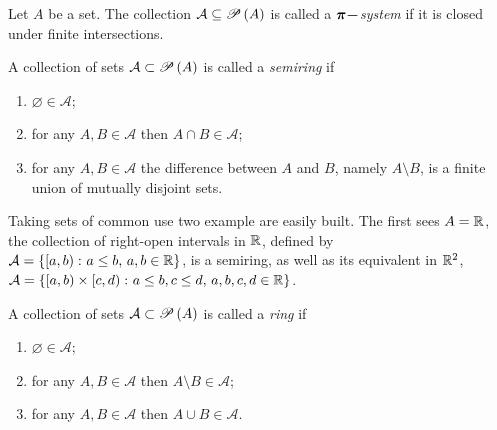 \begin{definition}[$\pi-$system]
    Let $A$ be a set. The collection $\mathcal{A}\subseteq\mathscr{P}\left( A \right)$ is called a $\boldsymbol{\pi-}$\emph{system} if it is closed under finite intersections.
\end{definition}

\begin{definition}[Semiring]
    A collection of sets $\mathcal{A}\subset\mathscr{P}\left( A \right)$ is called a \emph{semiring} if
    \begin{enumerate}[label=(\roman*)]
        \item $\varnothing\in\mathcal{A}$;
        \item for any $A,B\in\mathcal{A}$ then $A\cap B\in\mathcal{A}$;
        \item for any $A,B\in\mathcal{A}$ the difference between $A$ and $B$, namely $A\setminus B$, is a finite union of mutually disjoint sets.
    \end{enumerate}
\end{definition}
Taking sets of common use two example are easily built. The first sees $A=\mathbb{ R}$, the collection of right-open intervals in $\mathbb{ R}$, defined by $\mathcal{A}=\left\lbrace \left[ a,b\right) \colon a\leq b, \,a,b\in\mathbb{ R}  \right\rbrace$, is a semiring, as well as its equivalent in $\mathbb{ R}^{2}$, $\mathcal{A}=\left\lbrace \left[ a,b\right)\times\left[ c,d\right) \colon a\leq b, c\leq d, \,a,b,c,d\in\mathbb{ R}  \right\rbrace$.

\begin{definition}[Ring]
    A collection of sets $\mathcal{A}\subset\mathscr{P}\left( A \right)$ is called a \emph{ring} if
    \begin{enumerate}[label=(\roman*)]
        \item $\varnothing\in\mathcal{A}$;
        \item for any $A,B\in\mathcal{A}$ then $A\setminus B\in\mathcal{A}$;
        \item for any $A,B\in\mathcal{A}$  then $A\cup B\in\mathcal{A}$.
    \end{enumerate}
\end{definition}

